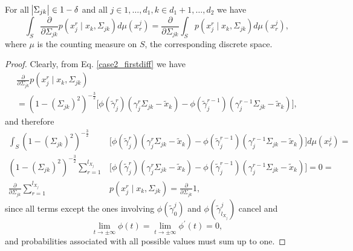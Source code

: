 \begin{lemma}\label{interchange_caseII_firstdif}
    For all $\abs{\Sigma_{jk}} \in 1-\delta$ and all $j \in 1, \dots, d_1, k\in d_1 +1, \dots, d_2$ we have
    \begin{equation*}
        \int_S \frac{\partial }{\partial \Sigma_{jk}} p(x_j^{r} \mid x_{k}, \Sigma_{jk}) d\mu(x_r^j)= \frac{\partial }{\partial \Sigma_{jk}} \int_S p(x_j^{r} \mid x_{k}, \Sigma_{jk}) d\mu(x_r^j),
    \end{equation*}
    where $\mu$ is the counting measure on $S$, the corresponding discrete space.
    
    \begin{proof}
        Clearly, from Eq. \eqref{case2_firstdiff} we have 
        \begin{multline*}
            \frac{\partial }{\partial \Sigma_{jk}} p(x_j^{r} \mid x_{k}, \Sigma_{jk}) \\
            =  (1-(\Sigma_{jk})^2)^{-\frac{3}{2}}\Big[\phi({\tilde{\gamma}}_j^{r})({\gamma}_j^r\Sigma_{jk} - {\tilde{x}}_{k}) - \phi({\tilde{\gamma}}_j^{r-1})({\gamma}_j^{r-1}\Sigma_{jk} - {\tilde{x}}_{k})\Big],
        \end{multline*}
        and therefore 
        \begin{equation*}
            \begin{split}
                \int_S (1-(\Sigma_{jk})^2)^{-\frac{3}{2}}&\Big[\phi({\tilde{\gamma}}_j^{r})({\gamma}_j^r\Sigma_{jk} - {\tilde{x}}_{k}) - \phi({\tilde{\gamma}}_j^{r-1})({\gamma}_j^{r-1}\Sigma_{jk} - {\tilde{x}}_{k})\Big] d\mu(x_r^j) = \\
                (1-(\Sigma_{jk})^2)^{-\frac{3}{2}} \sum_{r=1}^{l_{X_j}} &\Big[\phi({\tilde{\gamma}}_j^{r})({\gamma}_j^r\Sigma_{jk} - {\tilde{x}}_{k}) - \phi({\tilde{\gamma}}_j^{r-1})({\gamma}_j^{r-1}\Sigma_{jk} - {\tilde{x}}_{k})\Big] = 0 = \\
                \frac{\partial }{\partial \Sigma_{jk}} \sum_{r=1}^{l_{X_j}} &p(x_j^{r} \mid x_{k}, \Sigma_{jk}) = \frac{\partial }{\partial \Sigma_{jk}} 1,
            \end{split}
        \end{equation*}
        since all terms except the ones involving $\phi({\tilde{\gamma}}^j_{0})$ and $\phi({\tilde{\gamma}}^j_{l_{X_j}})$ cancel and 
        \begin{equation*}
            \lim\limits_{t \to \pm \infty} \phi(t) = \lim\limits_{t \to \pm \infty} \phi^\prime(t) = 0,
        \end{equation*} 
        and probabilities associated with all possible values must sum up to one. 
    \end{proof}
\end{lemma}

